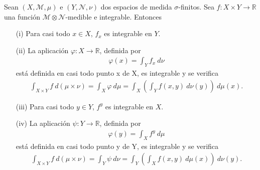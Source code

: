 \begin{teo}
Sean $(X, \mathcal{M}, \mu)$ e $(Y, \mathcal{N}, \nu)$ dos espacios de medida $\sigma$-finitos. Sea $f: X \times Y \longrightarrow \mathbb{R}$ una función $\mathcal{M} \otimes \mathcal{N}$-medible e integrable. Entonces
\begin{enumerate}
    \item[(i)] Para casi todo $x \in X$, $f_x$ es integrable en $Y$.
    \item[(ii)] La aplicación $\varphi: X \longrightarrow \mathbb{R}$, definida por
    \begin{align*}
        \varphi(x) = \int_{Y}{f_x \ d\nu}
    \end{align*}
    está definida en casi todo punto x de X, es integrable y se verifica
    \begin{align*}
        \int_{X \times Y}{f \ d(\mu \times \nu)} = \int_{X}{\varphi \ d\mu} = \int_{X}\left( \int_{Y}{f(x,y) \ d\nu(y)}\right) \ d\mu(x).
    \end{align*}
    \item[(iii)] Para casi todo $y \in Y$, $f^y$ es integrable en $X$.
    \item[(iv)] La aplicación $\psi: Y \longrightarrow \mathbb{R}$, definida por
    \begin{align*}
        \varphi(y) = \int_{X}{f^y \ d\mu}
    \end{align*}
    está definida en casi todo punto y de Y, es integrable  y se verifica
    \begin{align*}
        \int_{X \times Y}{f \ d(\mu \times \nu)} = \int_{Y}{\psi \ d\nu} = \int_{Y}\left( \int_{X}{f(x,y) \ d\mu(x)}\right) \ d\nu(y).
    \end{align*}
\end{enumerate}
\end{teo}


